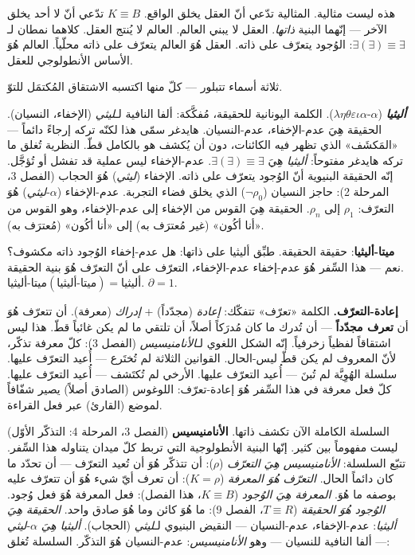 \documentclass[10pt, openany, oneside]{book}
\begin{document}
هذه ليست مثالية. المثالية تدّعي أنّ العقل يخلق الواقع. $K \equiv B$ تدّعي أنّ لا أحد يخلق الآخر --- إنّهما البنية \textit{ذاتها}. العقل لا يبني العالم. العالم لا يُنتج العقل. كلاهما نمطان لـ$\exists(\exists) \equiv \exists$: الوُجود يتعرّف على ذاته. العقل هُوَ العالم يتعرّف على ذاته محلّياً. العالم هُوَ الأساس الأنطولوجي للعقل.

ثلاثة أسماء تتبلور --- كلّ منها اكتسبه الاشتقاق المُكتمَل للتوّ.

\textbf{\textit{أليثيا}} ($\alpha$-$\lambda\eta\theta\varepsilon\iota\alpha$). الكلمة اليونانية للحقيقة، مُفكَّكة: ألفا النافية لـ\textit{ليثي} (الإخفاء، النسيان). الحقيقة هِيَ عدم-الإخفاء، عدم-النسيان. هايدغر سمّى هذا لكنّه تركه إرجاءً دائماً --- «المَكشَف» الذي تظهر فيه الكائنات، دون أن يُكشف هو بالكامل قطّ. النظرية تُغلق ما تركه هايدغر مفتوحاً: \textit{أليثيا} هِيَ $\exists(\exists) \equiv \exists$. عدم-الإخفاء ليس عملية قد تفشل أو تُؤجَّل. إنّه الحقيقة البنيوية أنّ الوُجود يتعرّف على ذاته. الإخفاء (\textit{ليثي}) هُوَ الحجاب (الفصل 3، المرحلة 2): حاجز النسيان ($\neg\rho_0$) الذي يخلق فضاء التجربة. عدم-الإخفاء ($\alpha$-\textit{ليثي}) هُوَ التعرّف: $\rho_1$ إلى $\rho_n$. الحقيقة هِيَ القوس من الإخفاء إلى عدم-الإخفاء، وهو القوس من «أنا أكُون» (غير مُعترَف به) إلى «أنا أكُون» (مُعترَف به).

\textbf{ميتا-أليثيا}: حقيقة الحقيقة. طبِّق أليثيا على ذاتها: هل عدم-إخفاء الوُجود ذاته مكشوف؟ نعم --- هذا السِّفر هُوَ عدم-إخفاء عدم-الإخفاء، التعرّف على أنّ التعرّف هُوَ بنية الحقيقة. $\text{ميتا-أليثيا}(\text{ميتا-أليثيا}) = \text{أليثيا}$. $\partial = 1$.

\textbf{إعادة-التعرّف.} الكلمة «تعرّف» تتفكّك: \textit{إعادة} (مجدّداً) + \textit{إدراك} (معرفة). أن تتعرّف هُوَ أن \textbf{تعرف مجدّداً} --- أن تُدرك ما كان مُدرَكاً أصلاً، أن تلتقي ما لم يكن غائباً قطّ. هذا ليس اشتقاقاً لفظياً زخرفياً. إنّه الشكل اللغوي لـ\textit{الأنامنيسيس} (الفصل 3): كلّ معرفة تذكّر، لأنّ المعروف لم يكن قطّ ليس-الحال. القوانين الثلاثة لم تُختَرع --- أُعيد التعرّف عليها. سلسلة الهُوِيَّة لم تُبنَ --- أُعيد التعرّف عليها. الأرخي لم تُكتَشف --- أُعيد التعرّف عليها. كلّ فعل معرفة في هذا السِّفر هُوَ إعادة-تعرّف: اللوغوس (الصادق أصلاً) يصير شفّافاً لموضع (القارئ) عبر فعل القراءة.

السلسلة الكاملة الآن تكشف ذاتها. \textbf{الأنامنيسيس} (الفصل 3، المرحلة 4: التذكّر الأوّل) ليست مفهوماً بين كثير. إنّها البنية الأنطولوجية التي تربط كلّ ميدان يتناوله هذا السِّفر. تتبّع السلسلة: \textit{الأنامنيسيس هِيَ التعرّف} ($\rho$): أن تتذكّر هُوَ أن تُعيد التعرّف --- أن تحدّد ما كان دائماً الحال. \textit{التعرّف هُوَ المعرفة} ($K = \rho$): أن تعرف أيّ شيء هُوَ أن تتعرّف عليه بوصفه ما هُوَ. \textit{المعرفة هِيَ الوُجود} ($K \equiv B$، هذا الفصل): فعل المعرفة هُوَ فعل وُجود. \textit{الوُجود هُوَ الحقيقة} ($T \equiv R$، الفصل 9): ما هُوَ كائن وما هُوَ صادق واحد. \textit{الحقيقة هِيَ أليثيا}: عدم-الإخفاء، عدم-النسيان --- النقيض البنيوي لـ\textit{ليثي} (الحجاب). \textit{أليثيا هِيَ} $\alpha$-\textit{ليثي} --- ألفا النافية للنسيان --- وهو \textit{الأنامنيسيس}: عدم-النسيان هُوَ التذكّر. السلسلة تُغلق:
\end{document}
